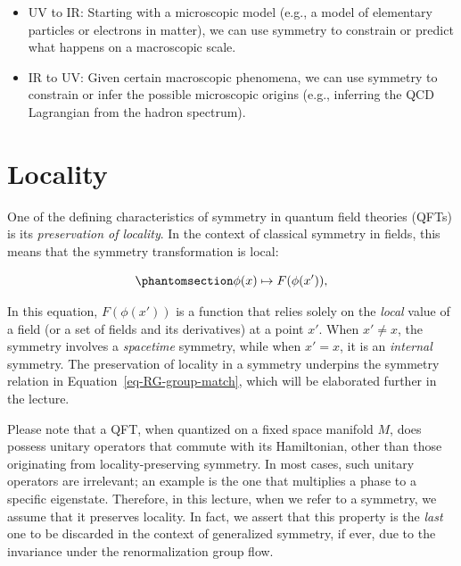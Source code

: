 \documentclass[
  letterpaper,
  DIV=11,
  numbers=noendperiod]{scrreport}
\providecommand{\tightlist}{%
  \setlength{\itemsep}{0pt}\setlength{\parskip}{0pt}}\usepackage{longtable,booktabs,array}
\begin{document}
\begin{itemize}
\tightlist
\item
  UV to IR: Starting with a microscopic model (e.g., a model of
  elementary particles or electrons in matter), we can use symmetry to
  constrain or predict what happens on a macroscopic scale.
\item
  IR to UV: Given certain macroscopic phenomena, we can use symmetry to
  constrain or infer the possible microscopic origins (e.g., inferring
  the QCD Lagrangian from the hadron spectrum).
\end{itemize}

\section{Locality}\label{locality}

One of the defining characteristics of symmetry in quantum field
theories (QFTs) is its \emph{preservation of locality}. In the context
of classical symmetry in fields, this means that the symmetry
transformation is local:

\begin{equation}\phantomsection\label{eq-field-transform}{
\phi(x) \mapsto F(\phi(x')),
}\end{equation}

In this equation, \(F(\phi(x'))\) is a function that relies solely on
the \emph{local} value of a field (or a set of fields and its
derivatives) at a point \(x'\). When \(x'\neq x\), the symmetry involves
a \emph{spacetime} symmetry, while when \(x'=x\), it is an
\emph{internal} symmetry. The preservation of locality in a symmetry
underpins the symmetry relation in Equation~\ref{eq-RG-group-match},
which will be elaborated further in the lecture.

\begin{tcolorbox}[enhanced jigsaw, arc=.35mm, bottomrule=.15mm, toprule=.15mm, title=\textcolor{quarto-callout-note-color}{\faInfo}\hspace{0.5em}{Note}, colback=white, opacitybacktitle=0.6, rightrule=.15mm, opacityback=0, breakable, bottomtitle=1mm, titlerule=0mm, leftrule=.75mm, coltitle=black, colframe=quarto-callout-note-color-frame, toptitle=1mm, left=2mm, colbacktitle=quarto-callout-note-color!10!white]

Please note that a QFT, when quantized on a fixed space manifold \(M\),
does possess unitary operators that commute with its Hamiltonian, other
than those originating from locality-preserving symmetry. In most cases,
such unitary operators are irrelevant; an example is the one that
multiplies a phase to a specific eigenstate. Therefore, in this lecture,
when we refer to a symmetry, we assume that it preserves locality. In
fact, we assert that this property is the \emph{last} one to be
discarded in the context of generalized symmetry, if ever, due to the
invariance under the renormalization group flow. \footnotemark{}

\end{tcolorbox}
\end{document}
